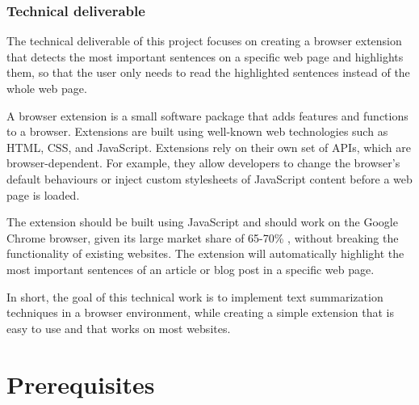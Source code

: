 \documentclass[conference,compsoc]{IEEEtran}
\begin{document}
\subsubsection{Technical deliverable}


The technical deliverable of this project focuses on creating a browser extension that detects the most important sentences on a specific web page and highlights them, so that the user only needs to read the highlighted sentences instead of the whole web page.

A browser extension is a small software package that adds features and functions to a browser. Extensions are built using well-known web technologies such as HTML, CSS, and JavaScript. Extensions rely on their own set of APIs, which are browser-dependent. For example, they allow developers to change the browser's default behaviours or inject custom stylesheets of JavaScript content before a web page is loaded.

The extension should be built using JavaScript and should work on the Google Chrome browser, given its large market share of 65-70\% \cite{netmarketshare} \cite{statcounter}, without breaking the functionality of existing websites. The extension will automatically highlight the most important sentences of an article or blog post in a specific web page.

In short, the goal of this technical work is to implement text summarization techniques in a browser environment, while creating a simple extension that is easy to use and that works on most websites.

\section{Prerequisites}
\end{document}

